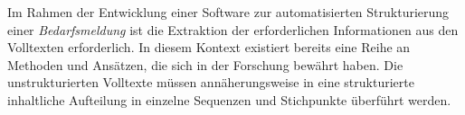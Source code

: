 Im Rahmen der Entwicklung einer Software zur automatisierten Strukturierung einer \emph{Bedarfsmeldung} ist die Extraktion der erforderlichen Informationen aus den Volltexten erforderlich. In diesem Kontext existiert bereits eine Reihe an Methoden und Ansätzen, die sich in der Forschung bewährt haben. Die unstrukturierten Volltexte müssen annäherungsweise in eine strukturierte inhaltliche Aufteilung in einzelne Sequenzen und Stichpunkte überführt werden.












